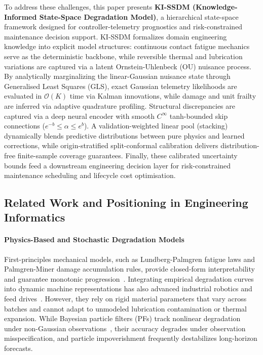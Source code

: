 \documentclass[a4paper,fleqn]{cas-dc}
\begin{document}
To address these challenges, this paper presents \textbf{KI-SSDM (Knowledge-Informed State-Space Degradation Model)}, a hierarchical state-space framework designed for controller-telemetry prognostics and risk-constrained maintenance decision support. KI-SSDM formalizes domain engineering knowledge into explicit model structures: continuous contact fatigue mechanics serve as the deterministic backbone, while reversible thermal and lubrication variations are captured via a latent Ornstein-Uhlenbeck (OU) nuisance process. By analytically marginalizing the linear-Gaussian nuisance state through Generalised Least Squares (GLS), exact Gaussian telemetry likelihoods are evaluated in $\mathcal{O}(K)$ time via Kalman innovations, while damage and unit frailty are inferred via adaptive quadrature profiling. Structural discrepancies are captured via a deep neural encoder with smooth $C^\infty$ tanh-bounded skip connections ($e^{-b} \le \alpha \le e^b$). A validation-weighted linear pool (stacking) dynamically blends predictive distributions between pure physics and learned corrections, while origin-stratified split-conformal calibration delivers distribution-free finite-sample coverage guarantees. Finally, these calibrated uncertainty bounds feed a downstream engineering decision layer for risk-constrained maintenance scheduling and lifecycle cost optimisation.

\subsection{Related Work and Positioning in Engineering Informatics}
\label{subsec:related}

\paragraph{Physics-Based and Stochastic Degradation Models}
First-principles mechanical models, such as Lundberg-Palmgren fatigue laws and Palmgren-Miner damage accumulation rules, provide closed-form interpretability and guarantee monotonic progression~\cite{Lei_2018, H_Li_2024, Yan_2021, N_Zhang_2024, Yucesan_2021}. Integrating empirical degradation curves into dynamic machine representations has also advanced industrial robotics and feed drives~\cite{Aivaliotis_2021, Tai_2023, Wan_2025}. However, they rely on rigid material parameters that vary across batches and cannot adapt to unmodeled lubrication contamination or thermal expansion. While Bayesian particle filters (PFs) track nonlinear degradation under non-Gaussian observations~\cite{Deng_2020, Yan_2021}, their accuracy degrades under observation misspecification, and particle impoverishment frequently destabilizes long-horizon forecasts.
\end{document}
